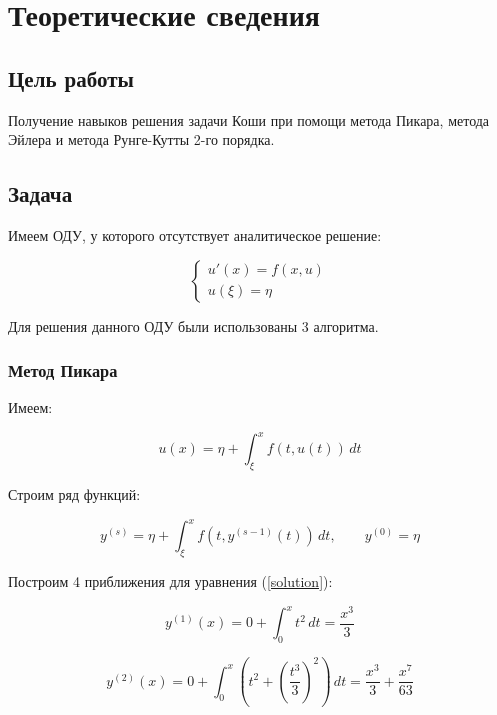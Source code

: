 \chapter{Теоретические сведения}

\section{Цель работы}
Получение навыков решения задачи Коши при помощи метода Пикара, метода Эйлера и метода Рунге-Кутты 2-го порядка.

\section{Задача}

Имеем ОДУ, у которого отсутствует аналитическое решение:

\begin{equation}
    \label{initial_odu}
    \begin{cases}
        u'(x) = f(x, u)\\
        u(\xi) = \eta
    \end{cases}
\end{equation}\newline

Для решения данного ОДУ были использованы 3 алгоритма.

\subsection{Метод Пикара}

Имеем:

\begin{equation}
    \label{solution}
    u(x) = \eta +  \int_{\xi}^{x} f(t,u(t)) \,dt
\end{equation}

Строим ряд функций:

\begin{equation}
    \label{sol}
    y^{(s)} = \eta +  \int_{\xi}^{x} f(t,y^{(s-1)}(t)) \,dt, \quad \quad
    y^{(0)} = \eta
\end{equation}

Построим 4 приближения для уравнения (\ref{solution}):

\begin{equation}
    \label{f1}
    y^{(1)}(x) = 0 + \int_{0}^{x} t^2 \,dt = \frac{x^3}{3}
\end{equation}

\begin{equation}
    \label{f2}
    y^{(2)}(x) = 0 + \int_{0}^{x} (t^2 + \left(\frac{t^3}{3}\right)^2) \,dt = \frac{x^3}{3} + \frac{x^7}{63}
\end{equation}


